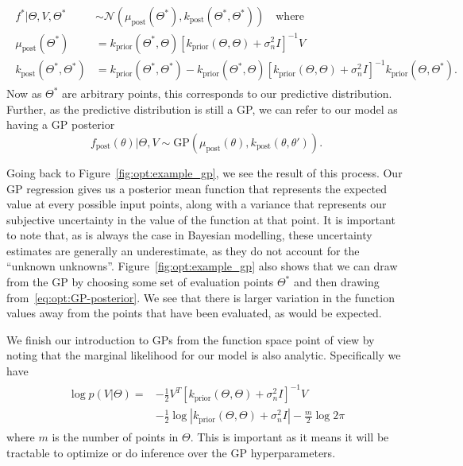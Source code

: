\begin{align}
\label{eq:opt:GP-posterior}
\begin{split}
f^* | \Theta, V, \Theta^* &\sim \mathcal{N}\left(\mu_{\text{post}} \left(\Theta^*\right), 
k_{\text{post}} \left(\Theta^*,\Theta^*\right) \right) \quad \text{where} \\
\mu_{\text{post}}  \left(\Theta^*\right) & = k_{\text{prior}}\left(\Theta^*,{\Theta} \right) \left[k_{\text{prior}}\left({\Theta} ,{\Theta}  \right) + \sigma_n^2 I\right]^{-1} V\\
k_{\text{post}} \left(\Theta^*,\Theta^*\right) & = k_{\text{prior}} \left(\Theta^*,\Theta^*\right) - k_{\text{prior}}\left(\Theta^*,{\Theta} \right) \left[k_{\text{prior}}\left({\Theta},{\Theta} \right) + \sigma_n^2 I\right]^{-1} k_{\text{prior}}\left({\Theta} ,\Theta^*\right).
\end{split}
\end{align}
Now as $\Theta^*$ are arbitrary points, this corresponds to our predictive distribution.
Further, as the predictive distribution is still a GP, we can refer to our
model as having a GP posterior
\[
f_{\text{post}} (\theta) | \Theta, V \sim \text{GP}\left(\mu_{\text{post}} (\theta),k_{\text{post}}(\theta,\theta')\right).
\]

Going back to Figure~\ref{fig:opt:example_gp}, we see the result of this process.
Our GP regression gives us a posterior mean function that represents the expected value
at every possible input points, along with a variance that represents our subjective
uncertainty in the value of the function at that point.  It is important to note that, as is
always the case in Bayesian modelling, these uncertainty estimates are generally  an underestimate,
as they do not account for the ``unknown unknowns''.  Figure~\ref{fig:opt:example_gp} also
shows that we can draw from the GP by choosing some set of evaluation points $\Theta^*$ and
then drawing from~\eqref{eq:opt:GP-posterior}.  We see that there is larger variation in the
function values away from the points that have been evaluated, as would be expected.

We finish our introduction to GPs from the function space point of view by noting that the
marginal likelihood for our model is also analytic.  Specifically we have
\begin{align}
\label{eq:opt:GP-ML}
\begin{split}
\log p(V | \Theta) = &-\frac{1}{2} V^T \left[k_{\text{prior}}\left({\Theta} ,{\Theta}  \right) + \sigma_n^2 I\right]^{-1} V \\
&-\frac{1}{2} \log \left|k_{\text{prior}}\left({\Theta} ,{\Theta}  \right) + \sigma_n^2 I\right|-\frac{m}{2} \log 2\pi
\end{split}
\end{align}
where $m$ is the number of points in $\Theta$.  This is important as it means it will be tractable to
optimize or do inference over the GP hyperparameters.

